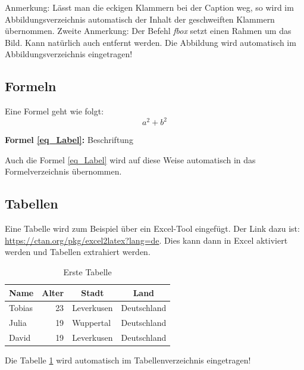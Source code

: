 Anmerkung: Lässt man die eckigen Klammern bei der Caption weg, so wird im Abbildungsverzeichnis automatisch der Inhalt der geschweiften Klammern übernommen.
Zweite Anmerkung: Der Befehl \textit{fbox} setzt einen Rahmen um das Bild. Kann natürlich auch entfernt werden. Die Abbildung wird automatisch im Abbildungsverzeichnis eingetragen!

\subsection{Formeln}
\label{Formeln}

Eine Formel geht wie folgt:\\
\begin{equation} \label{eq_Label}
    a^2+b^2
\end{equation}
\centerline{\textbf{Formel \ref{eq_Label}:} Beschriftung}

Auch die Formel \ref{eq_Label} wird auf diese Weise automatisch in das Formelverzeichnis übernommen.

\subsection{Tabellen}
\label{Tabellen}
Eine Tabelle wird zum Beispiel über ein Excel-Tool eingefügt. Der Link dazu ist: \url{https://ctan.org/pkg/excel2latex?lang=de}.
Dies kann dann in Excel aktiviert werden und Tabellen extrahiert werden.

\begin{table}[htbp]
    \centering
    \caption{Erste Tabelle}
    \begin{tabular}{lrll}
        \toprule
        \multicolumn{1}{c}{\textbf{Name}}          & \multicolumn{1}{c}{\textbf{Alter}} & \multicolumn{1}{c}{\textbf{Stadt}} & \multicolumn{1}{c}{\textbf{Land}} \\
        \midrule
        \rowcolor[rgb]{ .851,  .851,  .851} Tobias & 23                                 & Leverkusen                         & Deutschland                       \\
        Julia                                      & 19                                 & Wuppertal                          & Deutschland                       \\
        \rowcolor[rgb]{ .851,  .851,  .851} David  & 19                                 & Leverkusen                         & Deutschland                       \\
        \bottomrule
    \end{tabular}%
    \label{tab_erste Tabelle}%
\end{table}%
Die Tabelle \ref{tab_erste Tabelle} wird automatisch im Tabellenverzeichnis eingetragen!

